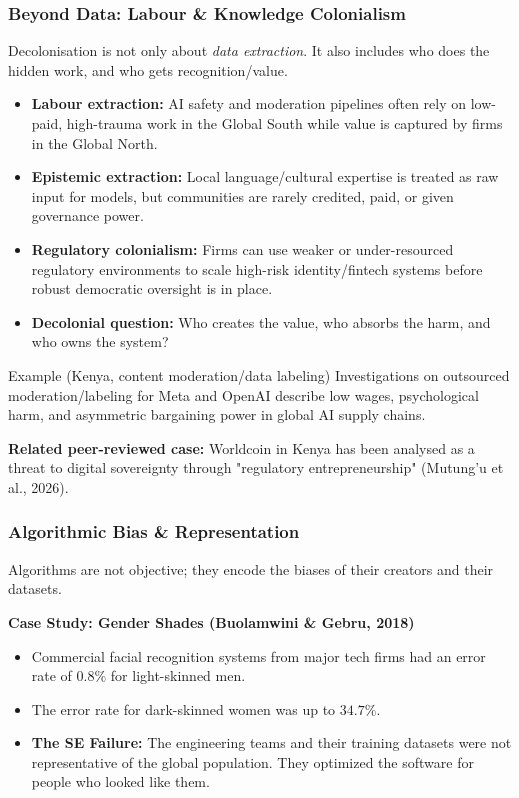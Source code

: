 \documentclass[xcolor=table]{beamer}
\begin{document}
\begin{frame}
    \frametitle{Beyond Data: Labour \& Knowledge Colonialism}
    \footnotesize
    Decolonisation is not only about \textit{data extraction}. It also includes who does the hidden work, and who gets recognition/value.

    \vspace{0.2cm}
    \begin{itemize}
        \item \textbf{Labour extraction:} AI safety and moderation pipelines often rely on low-paid, high-trauma work in the Global South while value is captured by firms in the Global North.
        \item \textbf{Epistemic extraction:} Local language/cultural expertise is treated as raw input for models, but communities are rarely credited, paid, or given governance power.
        \item \textbf{Regulatory colonialism:} Firms can use weaker or under-resourced regulatory environments to scale high-risk identity/fintech systems before robust democratic oversight is in place.
        \item \textbf{Decolonial question:} Who creates the value, who absorbs the harm, and who owns the system?
    \end{itemize}

    \vspace{0.2cm}
    \begin{block}{Example (Kenya, content moderation/data labeling)}
        Investigations on outsourced moderation/labeling for Meta and OpenAI describe low wages, psychological harm, and asymmetric bargaining power in global AI supply chains.
    \end{block}

    \vspace{0.1cm}
    \textbf{Related peer-reviewed case:} Worldcoin in Kenya has been analysed as a threat to digital sovereignty through "regulatory entrepreneurship" (Mutung'u et al., 2026).
\end{frame}

\begin{frame}
    \frametitle{Algorithmic Bias \& Representation}
    Algorithms are not objective; they encode the biases of their creators and their datasets.
    
    \vspace{0.3cm}
    \textbf{Case Study: Gender Shades (Buolamwini \& Gebru, 2018)}
    \begin{itemize}
        \item Commercial facial recognition systems from major tech firms had an error rate of $0.8\%$ for light-skinned men.
        \item The error rate for dark-skinned women was up to \textbf{$34.7\%$}.
        \item \textbf{The SE Failure:} The engineering teams and their training datasets were not representative of the global population. They optimized the software for people who looked like them.
    \end{itemize}
\end{frame}
\end{document}
